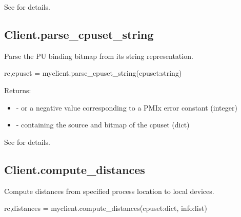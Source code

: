 See  for details.

\subsection{Client.parse_cpuset_string}

\summary
Parse the \ac{PU} binding bitmap from its string representation.

\format

\pyspecificstart
\begin{codepar}
rc,cpuset = myclient.parse_cpuset_string(cpuset:string)
\end{codepar}
\pyspecificend

\begin{arglist}
\end{arglist}


Returns:

\begin{itemize}
    \item {} -  or a negative value corresponding to a PMIx error constant (integer)
    \item {} -  containing the source and bitmap of the cpuset (dict)
\end{itemize}

See  for details.


\subsection{Client.compute_distances}

\summary
Compute distances from specified process location to local devices.

\format

\pyspecificstart
\begin{codepar}
rc,distances = myclient.compute_distances(cpuset:dict, info:list)
\end{codepar}
\pyspecificend

\begin{arglist}
\end{arglist}


